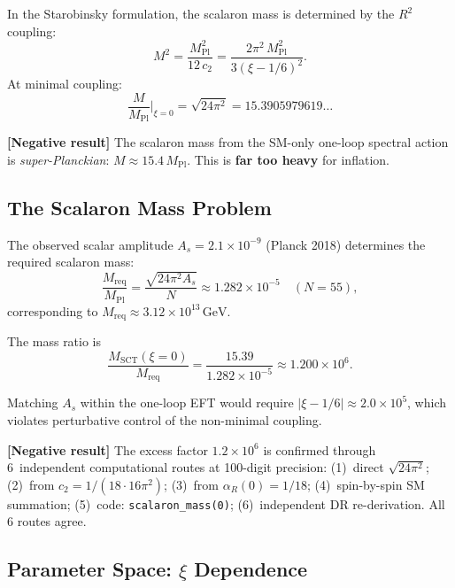 \documentclass[11pt,a4paper]{article}
\theoremstyle{plain}
\theoremstyle{definition}
\newcommand{\negresult}[1]{%
  \par\smallskip\noindent
  \colorbox{red!10}{\parbox{\dimexpr\linewidth-2\fboxsep}{%
    \textcolor{red!60!black}{\textbf{[Negative result]}} #1}}%
  \par\smallskip}
\begin{document}
In the Starobinsky formulation, the scalaron mass is determined by the
$R^2$ coupling:
\begin{equation}\label{eq:scalaron-mass}
  M^2 = \frac{M_{\mathrm{Pl}}^2}{12\,c_2}
  = \frac{2\pi^2\,M_{\mathrm{Pl}}^2}{3(\xi - 1/6)^2}.
\end{equation}
At minimal coupling:
\begin{equation}\label{eq:M-xi0}
  \frac{M}{M_{\mathrm{Pl}}}\bigg|_{\xi=0}
  = \sqrt{24\pi^2}
  = 15.3905979619\ldots
\end{equation}

\negresult{The scalaron mass from the SM-only one-loop spectral action is
\emph{super-Planckian}: $M \approx 15.4\,M_{\mathrm{Pl}}$.
This is \textbf{far too heavy} for inflation.}

\subsection{The Scalaron Mass Problem}

The observed scalar amplitude $A_s = 2.1 \times 10^{-9}$ (Planck 2018)
determines the required scalaron mass:
\begin{equation}\label{eq:M-required}
  \frac{M_{\mathrm{req}}}{M_{\mathrm{Pl}}}
  = \frac{\sqrt{24\pi^2 A_s}}{N}
  \approx 1.282 \times 10^{-5}
  \quad (N = 55),
\end{equation}
corresponding to $M_{\mathrm{req}} \approx 3.12 \times 10^{13}\,\mathrm{GeV}$.

The mass ratio is
\begin{equation}\label{eq:mass-ratio}
  \frac{M_{\mathrm{SCT}}(\xi=0)}{M_{\mathrm{req}}}
  = \frac{15.39}{1.282 \times 10^{-5}}
  \approx 1.200 \times 10^6.
\end{equation}

Matching $A_s$ within the one-loop EFT would require
$|\xi - 1/6| \approx 2.0 \times 10^5$, which violates perturbative
control of the non-minimal coupling.

\negresult{The excess factor $1.2 \times 10^6$ is confirmed through
6~independent computational routes at 100-digit precision:
(1)~direct $\sqrt{24\pi^2}$;
(2)~from $c_2 = 1/(18 \cdot 16\pi^2)$;
(3)~from $\alpha_R(0) = 1/18$;
(4)~spin-by-spin SM summation;
(5)~code: \texttt{scalaron\_mass(0)};
(6)~independent DR re-derivation.
All 6 routes agree.}

\subsection{Parameter Space: $\xi$ Dependence}\label{sec:xi-dependence}
\end{document}
